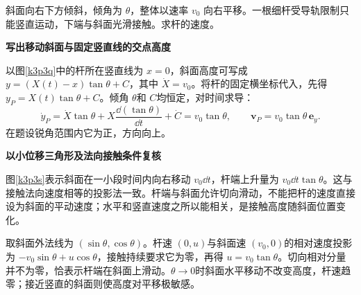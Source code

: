 \begin{question}\begin{example}[平移斜面顶起竖杆]\label{k3p3}
斜面向右下方倾斜，倾角为 $\theta$，整体以速率 $v_0$ 向右平移。一根细杆受导轨限制只能竖直运动，下端与斜面光滑接触。求杆的速度。\end{example}
\end{question}
\begin{solution}\textbf{写出移动斜面与固定竖直线的交点高度}\par\nobreak
以图\ref{k3p3q}中的杆所在竖直线为 $x=0$，斜面高度可写成 $y=(X(t)-x)\tan\theta+C$，其中 $\dot X=v_0$。将杆的固定横坐标代入，先得 $y_P=X(t)\tan\theta+C$。倾角 $\theta$和 $C$均恒定，对时间求导：
\[
 \dot y_P=\dot X\tan\theta+X\frac{\dd(\tan\theta)}{\dd t}
 +\dot C=v_0\tan\theta,
 \qquad \boxed{\bm v_P=v_0\tan\theta\,\bm e_y}.
\]
在题设锐角范围内它为正，方向向上。



\par\medskip{}\noindent\textbf{以小位移三角形及法向接触条件复核}\par\nobreak
图\ref{k3p3s}表示斜面在一小段时间内向右移动 $v_0\dd t$，杆端上升量为 $v_0\dd t\tan\theta$。这与接触法向速度相等的投影法一致。杆端与斜面允许切向滑动，不能把杆的速度直接设为斜面的平动速度；水平和竖直速度之所以能相关，是接触高度随斜面位置变化。

取斜面外法线为 $(\sin\theta,\cos\theta)$。杆速 $(0,u)$与斜面速 $(v_0,0)$的相对速度投影为 $-v_0\sin\theta+u\cos\theta$，接触持续要求它为零，再得 $u=v_0\tan\theta$。切向相对分量并不为零，恰表示杆端在斜面上滑动。$\theta\to0$时斜面水平移动不改变高度，杆速趋零；接近竖直的斜面则使高度对平移极敏感。\end{solution}

